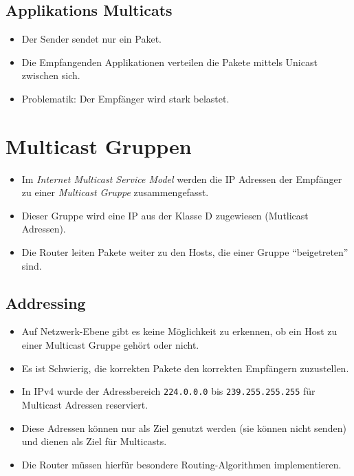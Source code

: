 \documentclass[a4paper, 11pt, accentcolor = tud3b]{tudreport}
\begin{document}
            \subsection{Applikations Multicats}
	            \begin{itemize}
	            	\item Der Sender sendet nur ein Paket.
	            	\item Die Empfangenden Applikationen verteilen die Pakete mittels Unicast zwischen sich.
	            	\item Problematik: Der Empfänger wird stark belastet.
	            \end{itemize}

        \section{Multicast Gruppen}
            \begin{itemize}
            	\item Im \textit{Internet Multicast Service Model} werden die IP Adressen der Empfänger zu einer \textit{Multicast Gruppe} zusammengefasst.
            	\item Dieser Gruppe wird eine IP aus der Klasse D zugewiesen (Mutlicast Adressen).
            	\item Die Router leiten Pakete weiter zu den Hosts, die einer Gruppe \enquote{beigetreten} sind.
            \end{itemize}

            \subsection{Addressing}
	            \begin{itemize}
	            	\item Auf Netzwerk-Ebene gibt es keine Möglichkeit zu erkennen, ob ein Host zu einer Multicast Gruppe gehört oder nicht.
	            	\item Es ist Schwierig, die korrekten Pakete den korrekten Empfängern zuzustellen.
	            	\item In IPv4 wurde der Adressbereich \texttt{224.0.0.0} bis \texttt{239.255.255.255} für Multicast Adressen reserviert.
	            	\item Diese Adressen können nur als Ziel genutzt werden (sie können nicht senden) und dienen als Ziel für Multicasts.
	            	\item Die Router müssen hierfür besondere Routing-Algorithmen implementieren.
	            \end{itemize}
\end{document}

